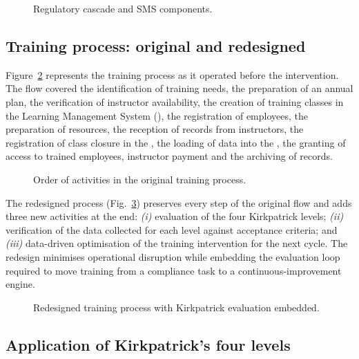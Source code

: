\begin{figure}[!tbp]
  \centering
  \resizebox{0.95\textwidth}{!}{}
  \caption{Regulatory cascade and SMS components.}
  \label{fig:regulation}
\end{figure}

\subsection{Training process: original and redesigned}
\label{subsec:results-process}

Figure~\ref{fig:process-original} represents the training process as it
operated before the intervention. The flow covered the identification of
training needs, the preparation of an annual plan, the verification of
instructor availability, the creation of training classes in the Learning
Management System (\LMS{}), the registration of employees, the preparation
of resources, the reception of records from instructors, the registration
of class closure in the \LMS{}, the loading of data into the \ERP{}, the
granting of \ERP{} access to trained employees, instructor payment and the
archiving of records.

\begin{figure}[!tbp]
  \centering
  \resizebox{0.95\textwidth}{!}{}
  \caption{Order of activities in the original training process.}
  \label{fig:process-original}
\end{figure}

The redesigned process (Fig.~\ref{fig:process-changed}) preserves every step
of the original flow and adds three new activities at the end:
\textit{(i)} evaluation of the four Kirkpatrick levels;
\textit{(ii)} verification of the data collected for each level against
acceptance criteria; and \textit{(iii)} data-driven optimisation of the
training intervention for the next cycle. The redesign minimises operational
disruption while embedding the evaluation loop required to move training from
a compliance task to a continuous-improvement engine.

\begin{figure}[!tbp]
  \centering
  \resizebox{0.95\textwidth}{!}{}
  \caption{Redesigned training process with Kirkpatrick evaluation embedded.}
  \label{fig:process-changed}
\end{figure}

\subsection{Application of Kirkpatrick's four levels}
\label{subsec:results-levels}

